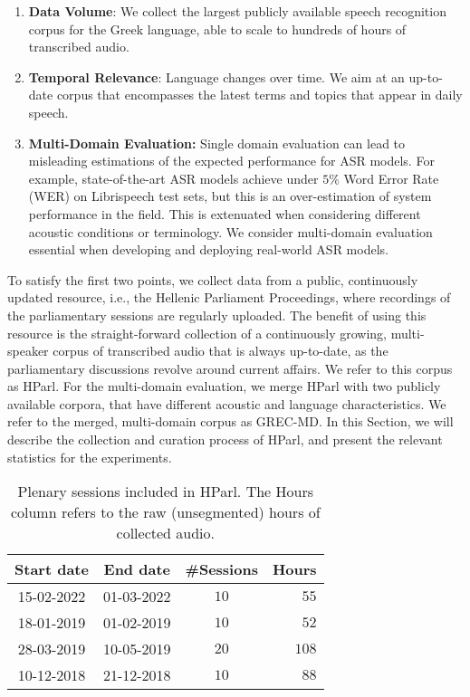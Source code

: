 \documentclass[journal]{IEEEtran}
\begin{document}
\begin{enumerate}
    \item \textbf{Data Volume}: We collect the largest publicly available speech recognition corpus for the Greek language, able to scale to hundreds of hours of transcribed audio.
    \item \textbf{Temporal Relevance}: Language changes over time. We aim at an up-to-date corpus that encompasses the latest terms and topics that appear in daily speech.
    \item \textbf{Multi-Domain Evaluation:} Single domain evaluation can lead to misleading estimations of the expected performance for ASR models. For example, state-of-the-art ASR models \cite{gulati2020conformer} achieve under $5\%$ Word Error Rate (WER) on Librispeech  \cite{panayotov2015librispeech} test sets, but this is an over-estimation of system performance in the field. This is extenuated when considering different acoustic conditions or terminology. We consider multi-domain evaluation essential when developing and deploying real-world ASR models.
\end{enumerate}



To satisfy the first two points, we collect data from a public, continuously updated resource, i.e., the Hellenic Parliament Proceedings, where recordings of the parliamentary sessions are regularly uploaded. The benefit of using this resource is the straight-forward collection of a continuously growing, multi-speaker corpus of transcribed audio that is always up-to-date, as the parliamentary discussions revolve around current affairs. We refer to this corpus as HParl.
For the multi-domain evaluation, we merge HParl with two publicly available corpora, that have different acoustic and language characteristics. We refer to the merged, multi-domain corpus as GREC-MD.
In this Section, we will describe the collection and curation process of HParl, and present the relevant statistics for the experiments.

\begin{table}[ht]
\caption{\label{tab:proceedings-table}Plenary sessions included in HParl. The Hours column refers to the raw (unsegmented) hours of collected audio.}
\centering
\begin{tabular}{cccr}
\toprule
\textbf{Start date} & \textbf{End date} & \textbf{\#Sessions} & \multicolumn{1}{c}{\textbf{Hours}} \\ \midrule
15-02-2022 & 01-03-2022 & $10$ & $55$ \\
18-01-2019 & 01-02-2019 & $10$ & $52$ \\
28-03-2019 & 10-05-2019 & $20$ & $108$ \\
10-12-2018 & 21-12-2018 & $10$ & $88$ \\ \bottomrule
\end{tabular}
\end{table}
\end{document}
